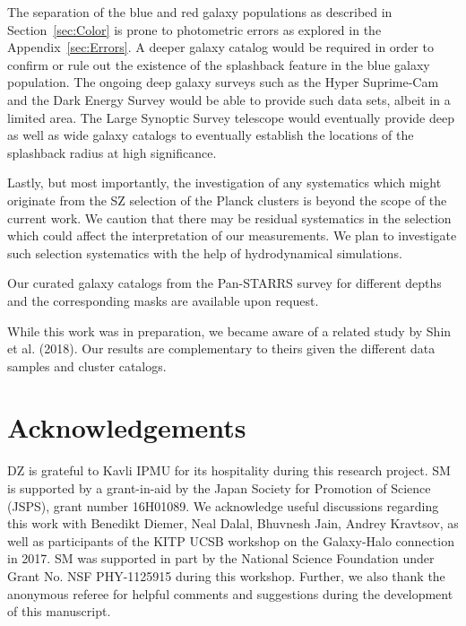 \documentclass[iop, apjl, twocolappendix, numberedappendix]{emulateapj}
\begin{document}
The separation of the blue and red galaxy populations as described in
Section~\ref{sec:Color} is prone to photometric errors as explored in
the Appendix~\ref{sec:Errors}. A deeper galaxy catalog would be required in order to
confirm or rule out the existence of the splashback feature in the
blue galaxy population. The ongoing deep galaxy surveys such as the
Hyper Suprime-Cam \citep{Aihara2018} and the Dark Energy Survey \citep{Abbott2018} would be able
to provide such data sets, albeit in a limited area. The Large
Synoptic Survey telescope \citep{LSST2009} would eventually provide deep as well
as wide galaxy catalogs to eventually establish the locations of the
splashback radius at high significance.

Lastly, but most importantly, the investigation of any systematics
which might originate from the SZ selection of the Planck clusters
is beyond the scope of the current work. We caution that there may
be residual systematics in the selection which could affect the
interpretation of our measurements. We plan to investigate such
selection systematics with the help of hydrodynamical simulations.

Our curated galaxy catalogs from the Pan-STARRS survey for different
depths and the corresponding masks are available upon request.

While this work was in preparation, we became aware of a related study
by Shin et al. (2018). Our results are complementary to theirs given
the different data samples and cluster catalogs.

\section*{Acknowledgements}
DZ is grateful to Kavli IPMU for its hospitality during this research
project. SM is supported by a grant-in-aid by the Japan Society for
Promotion of Science (JSPS), grant number 16H01089. We acknowledge
useful discussions regarding this work with Benedikt Diemer, Neal
Dalal, Bhuvnesh Jain, Andrey Kravtsov, as well as participants of the
KITP UCSB workshop on the Galaxy-Halo connection in 2017. SM was
supported in part by the National Science Foundation under Grant No.
NSF PHY-1125915 during this workshop. Further, we also thank the anonymous
referee for helpful comments and suggestions during the development of this 
manuscript.
\end{document}
